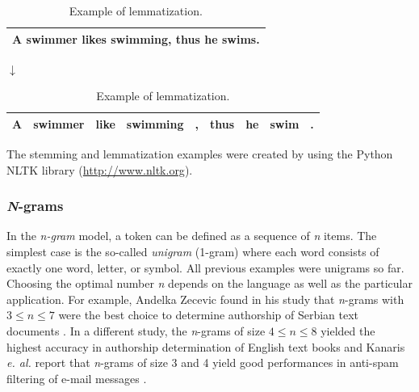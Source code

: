 \documentclass{article}
\begin{document}
\begin{table}[H]
\caption{Example of lemmatization.}
\begin{center}
\begin{tabular}{ | c | }
\hline
A swimmer likes swimming, thus he swims. \\ \hline
\end{tabular}

$\downarrow$

\begin{tabular}{ | c | c | c |  c | c | c | c | c | c | }
\hline
A & swimmer &  like & swimming & , & thus & he & swim & .\\ \hline
\end{tabular}
\end{center}
\end{table}

The stemming and lemmatization examples were created by using the Python NLTK library (\href{http://www.nltk.org}{http://www.nltk.org}).



\subsubsection{\emph{N}-grams}
\label{sec:n-grams} 

In the \emph{n-gram} model, a token can be defined as a sequence of \emph{n} items. The simplest case is the so-called \emph{unigram} (1-gram) where each word consists of exactly one word, letter, or symbol. All previous examples were unigrams so far. Choosing the optimal number \emph{n} depends on the language as well as the particular application. For example, Andelka Zecevic found in his study that \emph{n}-grams with $3 \le n \le 7$ were the best choice to determine authorship of Serbian text documents \cite{zevcevic2011n}. In a different study, the \emph{n}-grams of size $4 \le n \le 8$ yielded the highest accuracy in authorship determination of English text books \cite{kevselj2003n} and Kanaris \emph{e. al.} report that \emph{n}-grams of size 3 and 4 yield good performances in anti-spam filtering of e-mail messages  \cite{kanaris2007words}.
\end{document}
